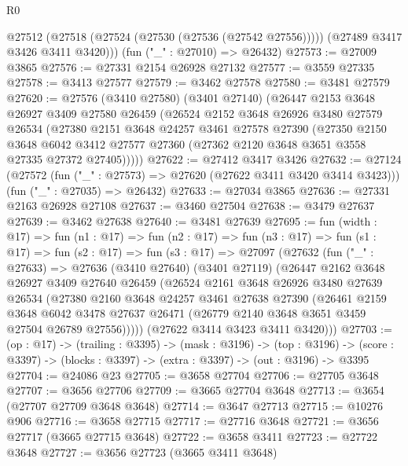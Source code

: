 \begin{lexlean}{R0}
\begin{coremodule}
      @27512 (@27518 (@27524 (@27530 (@27536 (@27542 @27556))))) (@27489 @3417 @3426 @3411 @3420)))
    (fun ("_" : @27010) => @26432)
@27573 := @27009 @3865
@27576 := @27331 @2154 @26928 @27132
@27577 := @3559 @27335
@27578 := @3413 @27577
@27579 := @3462 @27578
@27580 := @3481 @27579
@27620 := @27576
    (@3410 @27580)
    (@3401 @27140)
    (@26447
      @2153
      @3648
      @26927
      @3409
      @27580
      @26459
      (@26524
        @2152
        @3648
        @26926
        @3480
        @27579
        @26534
        (@27380
          @2151
          @3648
          @24257
          @3461
          @27578
          @27390
          (@27350
            @2150
            @3648
            @6042
            @3412
            @27577
            @27360
            (@27362 @2120 @3648 @3651 @3558 @27335 @27372 @27405)))))
@27622 := @27412 @3417 @3426
@27632 := @27124
    (@27572 (fun ("_" : @27573) => @27620 (@27622 @3411 @3420 @3414 @3423)))
    (fun ("_" : @27035) => @26432)
@27633 := @27034 @3865
@27636 := @27331 @2163 @26928 @27108
@27637 := @3460 @27504
@27638 := @3479 @27637
@27639 := @3462 @27638
@27640 := @3481 @27639
@27695 := fun (width : @17) =>
  fun (n1 : @17) =>
  fun (n2 : @17) =>
  fun (n3 : @17) =>
  fun (s1 : @17) =>
  fun (s2 : @17) =>
  fun (s3 : @17) =>
  @27097
    (@27632
      (fun ("_" : @27633) =>
      @27636
        (@3410 @27640)
        (@3401 @27119)
        (@26447
          @2162
          @3648
          @26927
          @3409
          @27640
          @26459
          (@26524
            @2161
            @3648
            @26926
            @3480
            @27639
            @26534
            (@27380
              @2160
              @3648
              @24257
              @3461
              @27638
              @27390
              (@26461
                @2159
                @3648
                @6042
                @3478
                @27637
                @26471
                (@26779 @2140 @3648 @3651 @3459 @27504 @26789 @27556)))))
        (@27622 @3414 @3423 @3411 @3420)))
@27703 := (op : @17) ->
  (trailing : @3395) ->
  (mask : @3196) ->
  (top : @3196) -> (score : @3397) -> (blocks : @3397) -> (extra : @3397) -> (out : @3196) -> @3395
@27704 := @24086 @23
@27705 := @3658 @27704
@27706 := @27705 @3648
@27707 := @3656 @27706
@27709 := @3665 @27704 @3648
@27713 := @3654 (@27707 @27709 @3648 @3648)
@27714 := @3647 @27713
@27715 := @10276 @906
@27716 := @3658 @27715
@27717 := @27716 @3648
@27721 := @3656 @27717 (@3665 @27715 @3648)
@27722 := @3658 @3411
@27723 := @27722 @3648
@27727 := @3656 @27723 (@3665 @3411 @3648)

\end{coremodule}
\end{lexlean}
